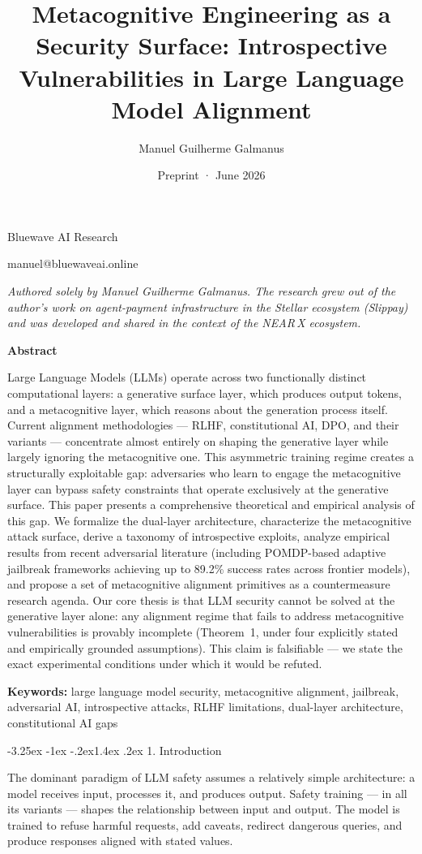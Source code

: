 \documentclass[
  11pt,
]{article}
\title{Metacognitive Engineering as a Security Surface: Introspective
Vulnerabilities in Large Language Model Alignment}
\author{Manuel Guilherme Galmanus}
\date{Preprint · June 2026}
\makeatletter
\renewcommand\section{\@startsection{section}{1}{\z@}%
  {-3.25ex \@plus -1ex \@minus -.2ex}{1.4ex \@plus.2ex}%
  {\normalfont\sffamily\Large\bfseries}}
\renewcommand{\maketitle}{%
  \begin{center}%
    {\LARGE\bfseries\@title\par}%
    \vspace{1.4em}%
    {\large\@author\par}%
    \vspace{0.35em}%
    {\normalsize Bluewave AI Research\par}%
    \vspace{0.15em}%
    {\normalsize\texttt{manuel@bluewaveai.online}\par}%
    \vspace{0.9em}%
    {\normalsize\@date\par}%
    \vspace{0.6em}%
    {\footnotesize\itshape
     Authored solely by Manuel Guilherme Galmanus. The research grew out of
     the author's work on agent-payment infrastructure in the Stellar
     ecosystem (Slippay) and was developed and shared in the context of the
     NEAR\,X ecosystem.\par}%
    \vspace{0.4em}%
  \end{center}%
  \vspace{0.6em}%
  \thispagestyle{plain}%
}
\renewenvironment{abstract}{%
  \vspace{0.4em}%
  \begin{center}\bfseries\normalsize Abstract\end{center}%
  \nopagebreak\par
  \begingroup
  \setlength{\leftskip}{2.2em}\setlength{\rightskip}{2.2em}%
  \small\noindent\ignorespaces
}{%
  \par\endgroup\vspace{1.0em}%
}
\renewcommand{\texttt}[1]{{\ttfamily\small #1}}
\makeatother
\begin{document}
\maketitle
\begin{abstract}
Large Language Models (LLMs) operate across two functionally distinct
computational layers: a generative surface layer, which produces output
tokens, and a metacognitive layer, which reasons about the generation
process itself. Current alignment methodologies --- RLHF, constitutional
AI, DPO, and their variants --- concentrate almost entirely on shaping
the generative layer while largely ignoring the metacognitive one. This
asymmetric training regime creates a structurally exploitable gap:
adversaries who learn to engage the metacognitive layer can bypass
safety constraints that operate exclusively at the generative surface.
This paper presents a comprehensive theoretical and empirical analysis
of this gap. We formalize the dual-layer architecture, characterize the
metacognitive attack surface, derive a taxonomy of introspective
exploits, analyze empirical results from recent adversarial literature
(including POMDP-based adaptive jailbreak frameworks achieving up to
89.2\% success rates across frontier models), and propose a set of
metacognitive alignment primitives as a countermeasure research agenda.
Our core thesis is that LLM security cannot be solved at the generative
layer alone: any alignment regime that fails to address metacognitive
vulnerabilities is provably incomplete (Theorem~1, under four explicitly
stated and empirically grounded assumptions). This claim is falsifiable
--- we state the exact experimental conditions under which it would be
refuted.

\par\vspace{0.6em}

\noindent\textbf{Keywords:} large language model security, metacognitive
alignment, jailbreak, adversarial AI, introspective attacks, RLHF
limitations, dual-layer architecture, constitutional AI gaps
\end{abstract}

\section{1. Introduction}\label{introduction}

The dominant paradigm of LLM safety assumes a relatively simple
architecture: a model receives input, processes it, and produces output.
Safety training --- in all its variants --- shapes the relationship
between input and output. The model is trained to refuse harmful
requests, add caveats, redirect dangerous queries, and produce responses
aligned with stated values.
\end{document}

